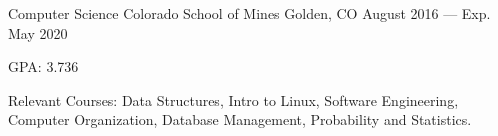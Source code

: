 

\begin{cventries}

  \cventry
    {Computer Science} %
    {Colorado School of Mines} %
    {Golden, CO} %
    {August 2016 --- Exp. May 2020} %
    {
      \begin{cvitems} %
        \item {GPA\@: 3.736}
        \item {Relevant Courses: Data Structures, Intro to Linux, Software Engineering, Computer Organization, Database Management, Probability and Statistics.}
      \end{cvitems}
    }

\end{cventries}
